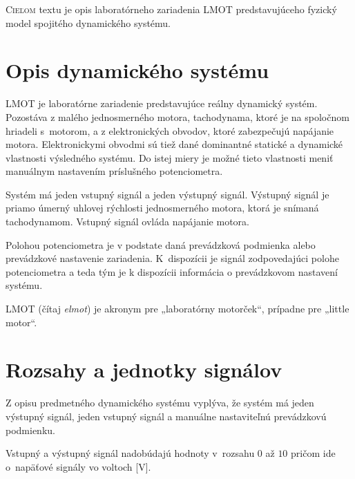 \documentclass[a4paper, 10pt, ]{article}
\begin{document}
\bigskip

\normalsize
\normalfont

\lstset{style=mystyle}










\noindent
\lettrine[lines=1, nindent=1pt, loversize=0.0]{C}{ieľom} 
textu je opis laboratórneho zariadenia LMOT predstavujúceho fyzický model spojitého dynamického systému.


\section{Opis dynamického systému}

LMOT je laboratórne zariadenie predstavujúce reálny dynamický systém. Pozostáva z malého jednosmerného motora, tachodynama, ktoré je na spoločnom hriadeli s~motorom, a z elektronických obvodov, ktoré zabezpečujú napájanie motora. Elektronickymi obvodmi sú tiež dané dominantné statické a dynamické vlastnosti výsledného systému. Do istej miery je možné tieto vlastnosti meniť manuálnym nastavením príslušného potenciometra.

Systém má jeden vstupný signál a jeden výstupný signál. Výstupný signál je priamo úmerný uhlovej rýchlosti jednosmerného motora, ktorá je snímaná tachodynamom. Vstupný signál ovláda napájanie motora.

Polohou potenciometra je v podstate daná prevádzková podmienka alebo prevádzkové nastavenie zariadenia. K~dispozícii je signál zodpovedajúci polohe potenciometra a teda tým je k dispozícii informácia o prevádzkovom nastavení systému.

LMOT (čítaj \emph{elmot}) je akronym pre „laboratórny motorček“, prípadne pre „little motor“.





\section{Rozsahy a jednotky signálov}

Z opisu predmetného dynamického systému vyplýva, že systém má jeden výstupný signál, jeden vstupný signál a manuálne nastaviteľnú prevádzkovú podmienku.

Vstupný a výstupný signál nadobúdajú hodnoty v~rozsahu $0$ až $10$ pričom ide o~napäťové signály vo voltoch [V].
\end{document}
